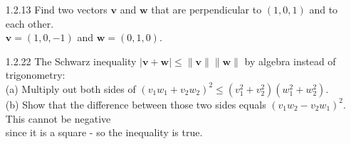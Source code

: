\documentclass[10pt,twoside,reqno]{article}
\begin{document}
\begin{enumerate}
(b.) If $\pmb{u}$ is perpendicular to $\pmb{v}$ and $\pmb{w}$, then $\pmb{u}$ is perpendicular to $\pmb{v} + 2\pmb{w}$.\\
\vspace{2mm}
\hspace{6mm} True. $\pmb{u} \pmb{\cdot} (\pmb{v} + 2\pmb{w}) = \pmb{u} \pmb{\cdot} \pmb{v} + 2\pmb{u} \pmb{\cdot} \pmb{w} = 0$\\
\vspace{2mm}
(c.) If $\pmb{u}$ and $\pmb{v}$ are perpendicular unit vectors then $\lVert\pmb{u} - \pmb{v}\rVert = \sqrt{2}$\\
\vspace{2mm}
\hspace{6mm} True. $\lVert\pmb{u} - \pmb{v}\rVert^2 = (\pmb{u} - \pmb{v}) \pmb{\cdot} (\pmb{u} - \pmb{v} )$ seperates into $\pmb{u} \pmb{\cdot} \pmb{u} + \pmb{v} \pmb{\cdot} \pmb{v} = 2$ when $\pmb{u} \pmb{\cdot} \pmb{v} = \pmb{v} \pmb{\cdot} \pmb{u} = 0$\\
\vspace{2mm}
\item[1.2.13] Find two vectors $\pmb{v}$ and $\pmb{w}$ that are perpendicular to $(1, 0, 1)$ and to each other.\\
\vspace{3mm}
$\pmb{v} = (1, 0, -1)$ and $\pmb{w} = (0, 1, 0)$.\\
\vspace{5mm}
\item[1.2.22] The Schwarz inequality $|\pmb{v} + \pmb{w}| \leq \lVert \pmb{v} \rVert \lVert \pmb{w} \rVert$ by algebra instead of trigonometry:\\
(a) Multiply out both sides of $(v_{1}w_{1} + v_{2}w_{2})^2 \leq (v_{1}^2 + v_{2}^2)(w_{1}^2 + w_{2}^2)$.\\
(b) Show that the difference between those two sides equals $(v_{1}w_{2} - v_{2}w_{1})^2$. This cannot be negative\\
\hspace{5mm} since it is a square - so the inequality is true.\\
\vspace{3mm}


\end{enumerate}
\end{document}
